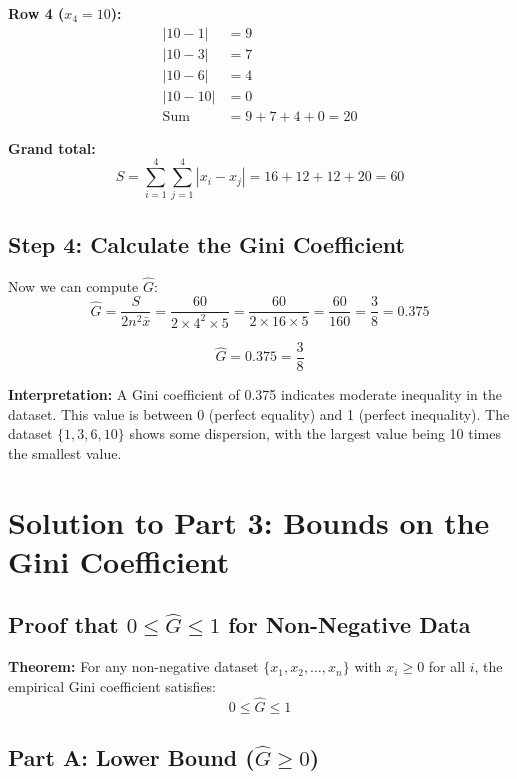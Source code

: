 \documentclass[12pt,a4paper]{article}
\theoremstyle{definition}
\begin{document}
\textbf{Row 4 ($x_4 = 10$):}
\begin{align*}
|10-1| &= 9 \\
|10-3| &= 7 \\
|10-6| &= 4 \\
|10-10| &= 0 \\
\text{Sum} &= 9 + 7 + 4 + 0 = 20
\end{align*}

\textbf{Grand total:}
\[
S = \sum_{i=1}^4 \sum_{j=1}^4 |x_i - x_j| = 16 + 12 + 12 + 20 = 60
\]

\subsection{Step 4: Calculate the Gini Coefficient}

Now we can compute $\hat{G}$:
\[
\hat{G} = \frac{S}{2n^2 \bar{x}} = \frac{60}{2 \times 4^2 \times 5} = \frac{60}{2 \times 16 \times 5} = \frac{60}{160} = \frac{3}{8} = 0.375
\]

\begin{tcolorbox}[colback=green!5!white,colframe=resultcolor,title=Result for Part 2]
\[
\boxed{\hat{G} = 0.375 = \frac{3}{8}}
\]

\textbf{Interpretation:} A Gini coefficient of 0.375 indicates moderate inequality in the dataset. This value is between 0 (perfect equality) and 1 (perfect inequality). The dataset $\{1, 3, 6, 10\}$ shows some dispersion, with the largest value being 10 times the smallest value.
\end{tcolorbox}

\section{Solution to Part 3: Bounds on the Gini Coefficient}

\subsection{Proof that $0 \leq \hat{G} \leq 1$ for Non-Negative Data}

\textbf{Theorem:} For any non-negative dataset $\{x_1, x_2, \ldots, x_n\}$ with $x_i \geq 0$ for all $i$, the empirical Gini coefficient satisfies:
\[
0 \leq \hat{G} \leq 1
\]

\subsection{Part A: Lower Bound ($\hat{G} \geq 0$)}
\end{document}
